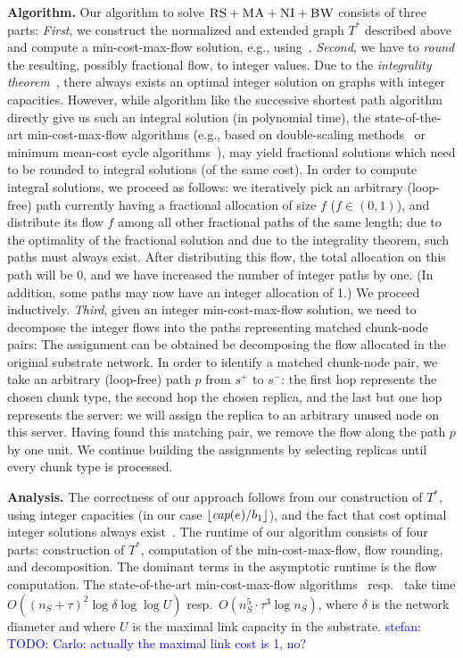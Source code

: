 \documentclass[9pt]{sigcomm-alternate}
\newcommand{\stefan}[1]{\textcolor{blue}{stefan: #1}}
\newcommand{\Source}{\ensuremath{s^{+}}}
\newcommand{\Sink}{\ensuremath{s^{-}}}
\newcommand{\capacity}{\emph{cap}}
\newcommand{\CC}{\textsc{NI}}
\newcommand{\RS}{\textsc{RS}}
\newcommand{\BW}{\textsc{BW}}
\newcommand{\MA}{\textsc{MA}}
\newcommand{\Tree}{\ensuremath{T}}
\newcommand{\CostTrans}{\ensuremath{b_1}}
\begin{document}
\textbf{Algorithm.}
Our algorithm to solve $\RS+\MA+\CC+\BW$ consists of three parts:
\emph{First}, we construct the normalized and extended graph $\Tree^*$ 
described above and compute
a min-cost-max-flow solution, e.g., using~\cite{mincostmaxflow-1,mincostmaxflow-2}.
\emph{Second}, we have to \emph{round} the resulting, possibly fractional flow, to
integer values. Due to the \emph{integrality theorem}~\cite{mincostmaxflow-1,mincostmaxflow-2},
there always exists an optimal integer solution on graphs with integer capacities.
However, while algorithm like the successive shortest path algorithm~\cite{successive_shortest_path_complexity}
directly give us such an integral solution (in polynomial time), the state-of-the-art min-cost-max-flow algorithms (e.g., based on double-scaling
methods~\cite{mincostmaxflow-1} or minimum mean-cost cycle algorithms~\cite{mincostmaxflow-2}), may yield fractional solutions
which need to be rounded to integral solutions (of the same cost). 
In order to compute integral solutions, we proceed as follows: we iteratively pick an arbitrary (loop-free) path 
currently having a fractional allocation of size $f$ ($f\in (0,1)$), and distribute its flow $f$ 
among all other fractional paths of the same length; due to the optimality of the fractional solution
and due to the integrality theorem, such paths must always exist. After distributing this flow,
the total allocation on this path will be 0, and we have increased the number of integer paths by one.
(In addition, some paths may now have an integer allocation of 1.) We proceed inductively. 
\emph{Third}, given an integer min-cost-max-flow solution, we need to decompose the integer flows into the paths
representing matched chunk-node pairs:
The assignment can be obtained be decomposing the flow allocated in the
original substrate network. In order to identify a matched chunk-node pair, 
we take an arbitrary (loop-free) path $p$ from $\Source$ to $\Sink$:
the first hop represents the chosen chunk type, the second hop the chosen
replica, and the last but one hop represents the server: we will assign
the replica to an arbitrary unused node on this server. 
Having found this matching pair, we remove the flow 
along the path $p$ by one unit.
We continue building the assignments by selecting replicas until every chunk type is processed.

\textbf{Analysis.}
The correctness of our approach follows from our construction
of $\Tree^*$, using integer capacities (in our case $\lfloor\capacity(e)/\CostTrans\rfloor$),
and the fact that cost optimal integer solutions always exist~\cite{mincostmaxflow-1,mincostmaxflow-2}.
The runtime of our algorithm consists of four parts: construction of $\Tree^*$,
computation of the min-cost-max-flow, flow rounding, and decomposition. The 
dominant terms in the asymptotic runtime is the flow computation.
The state-of-the-art min-cost-max-flow algorithms~\cite{mincostmaxflow-1} resp.~\cite{mincostmaxflow-2}
take time $O((n_S+\tau)^2 \log \delta \log\log U)$ resp.~$O(n_S^5 \cdot \tau^3 \log n_S)$, where $\delta$ is the 
network diameter and where $U$ is the maximal link capacity in the substrate.
\stefan{TODO: Carlo: actually the maximal link cost is 1, no?}
\end{document}
